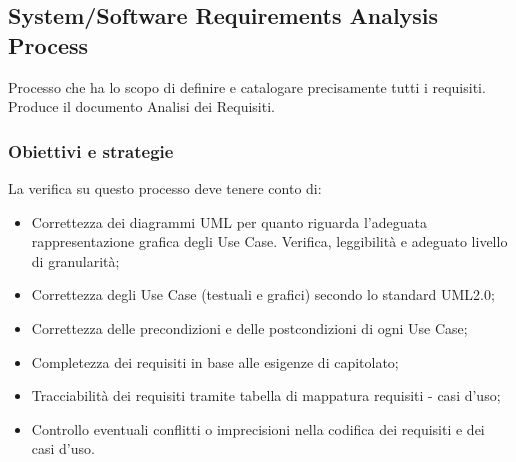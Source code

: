 \documentclass[a4paper,11pt]{article}
\begin{document}
\begin{itemize}
	

\subsection{System/Software Requirements Analysis Process}
Processo che ha lo scopo di definire e catalogare precisamente tutti i requisiti. Produce il documento Analisi dei Requisiti. 

\subsubsection{Obiettivi e strategie}
La verifica su questo processo deve tenere conto di:
\begin{itemize}
\item Correttezza dei diagrammi UML per quanto riguarda l'adeguata rappresentazione grafica degli Use Case. Verifica, leggibilità e adeguato livello di granularità;
\item Correttezza degli Use Case (testuali e grafici) secondo lo standard UML2.0;
\item Correttezza delle precondizioni e delle postcondizioni di ogni Use Case;
\item Completezza dei requisiti in base alle esigenze di capitolato;
\item Tracciabilità dei requisiti tramite tabella di mappatura requisiti - casi d'uso;
\item Controllo eventuali conflitti o imprecisioni nella codifica dei requisiti e dei casi d'uso.
\end{itemize}

\end{itemize}
\end{document}
